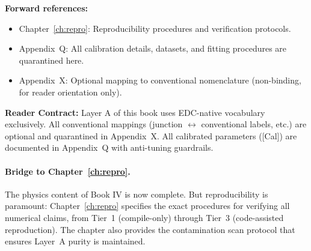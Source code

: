 \bigskip
\noindent
\textbf{Forward references:}
\begin{itemize}
    \item Chapter~\ref{ch:repro}: Reproducibility procedures and
          verification protocols.
    \item Appendix~Q: All calibration details, datasets, and fitting
          procedures are quarantined here.
    \item Appendix~X: Optional mapping to conventional nomenclature
          (non-binding, for reader orientation only).
\end{itemize}

\bigskip
\noindent
\textbf{Reader Contract:}
Layer A of this book uses EDC-native vocabulary exclusively. All
conventional mappings (junction $\leftrightarrow$ conventional labels,
etc.) are optional and quarantined in Appendix~X. All calibrated
parameters ([Cal]) are documented in Appendix~Q with anti-tuning
guardrails.

\paragraph{Bridge to Chapter~\ref{ch:repro}.}
The physics content of Book IV is now complete. But reproducibility is
paramount: Chapter~\ref{ch:repro} specifies the exact procedures for
verifying all numerical claims, from Tier~1 (compile-only) through
Tier~3 (code-assisted reproduction). The chapter also provides the
contamination scan protocol that ensures Layer~A purity is maintained.

